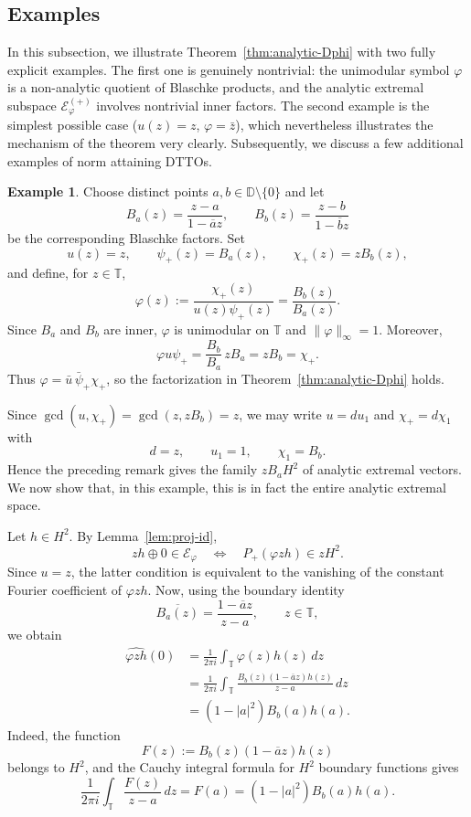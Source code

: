 \documentclass[12pt]{amsart}
\theoremstyle{definition}
\newtheorem{example}[theorem]{Example}
\theoremstyle{remark}
\def \D{\mathbb{D}}
\def \T{\mathbb{T}}
\newcommand{\cle}{\mathcal{E}}
\newcommand{\vp}{\varphi}
\numberwithin{equation}{section}
\begin{document}
\subsection{Examples}

In this subsection, we illustrate Theorem~\ref{thm:analytic-Dphi} with two fully explicit examples. The first one is genuinely nontrivial: the unimodular symbol $\vp$ is a non-analytic quotient of Blaschke products, and the analytic extremal subspace $\cle_\vp^{(+)}$ involves nontrivial inner factors. The second example is the simplest possible case ($u(z)=z$, $\vp=\bar{z}$), which nevertheless illustrates the mechanism of the theorem very clearly. Subsequently, we discuss a few additional examples of norm attaining DTTOs.


\begin{example}\label{ex:nontrivial}
Choose distinct points $a,b\in\D\setminus\{0\}$ and let
\[
B_a(z)=\frac{z-a}{1-\overline{a} z},\qquad
B_b(z)=\frac{z-b}{1-\overline b z}
\]
be the corresponding Blaschke factors. Set
\[
u(z)=z,\qquad \psi_{+}(z)=B_a(z),\qquad \chi_{+}(z)=zB_b(z),
\]
and define, for $z\in\T$,
\[
\vp(z):=\frac{\chi_{+}(z)}{u(z)\psi_{+}(z)} =\frac{B_b(z)}{B_a(z)}.
\]
Since $B_a$ and $B_b$ are inner, $\vp$ is unimodular on $\T$ and
$\|\vp\|_\infty=1$. Moreover,
\[
\vp u\psi_{+}=\frac{B_b}{B_a}\,zB_a=zB_b=\chi_{+}.
\]
Thus $\vp=\bar{u}\,\bar\psi_{+}\chi_{+}$, so the factorization in Theorem~\ref{thm:analytic-Dphi} holds.
	
Since $\gcd(u,\chi_{+})=\gcd(z,zB_b)=z$, we may write $u=du_1$ and $\chi_{+}=d\chi_1$ with
\[
d=z,\qquad u_1=1,\qquad \chi_1=B_b.
\]
Hence the preceding remark gives the family $zB_aH^2$ of analytic extremal vectors. We now show that, in this example, this is in fact the entire analytic extremal space.
	
Let $h\in H^2$. By Lemma~\ref{lem:proj-id},
\[
zh\oplus0\in\cle_\vp\quad\Longleftrightarrow\quad
P_{+}(\vp zh)\in zH^2.
\]
Since $u=z$, the latter condition is equivalent to the vanishing of
the constant Fourier coefficient of $\vp zh$. Now, using the boundary identity
\[
\overline{B_a(z)} =\frac{1-\overline{a}z}{z-a}, \qquad z\in\T,
\]
we obtain
\[
\begin{aligned}
	\widehat{\vp zh}(0)
	&=\frac{1}{2\pi i}\int_{\T}\vp(z)h(z)\,dz \\
	&=\frac{1}{2\pi i}\int_{\T}
	\frac{B_b(z)(1-\overline{a}z)h(z)}{z-a}\,dz \\
	&=(1-|a|^2)B_b(a)h(a).
\end{aligned}
\]
Indeed, the function
\[
F(z):=B_b(z)(1-\overline{a}z)h(z)
\]
belongs to $H^2$, and the Cauchy integral formula for $H^2$ boundary
functions gives
\[
\frac{1}{2\pi i}\int_{\T}\frac{F(z)}{z-a}\,dz =F(a)=(1-|a|^2)B_b(a)h(a).
\]


\end{example}
\end{document}
